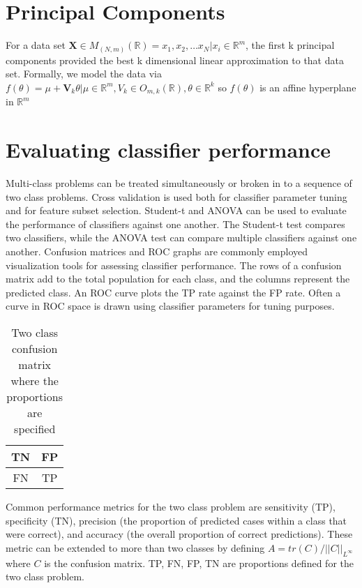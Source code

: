\section{Principal Components} For a data set $\textbf{X} \in
M_{(N,m)}(\mathbb{R}) = { x_1, x_2, \ldots x_N | x_i \in
\mathbb{R}^m } $, the first k principal components provided the
best k dimensional linear approximation to that data set.
Formally, we model the data via $f(\theta) = \mu + \textbf{V}_k
\theta | \mu \in \mathbb{R}^m, V_k \in O_{m,k}(\mathbb{R}),
\theta \in \mathbb{R}^k$ so $f(\theta)$ is an affine hyperplane
in $\mathbb{R}^m$


\section{Evaluating classifier performance} Multi-class problems can be treated simultaneously or broken in to a sequence of two class problems.  Cross validation is used both for classifier parameter tuning and for feature subset selection.  Student-t and ANOVA can be used to evaluate the performance of classifiers against one another.  The Student-t test compares two classifiers, while the ANOVA test can compare multiple classifiers against one another.  Confusion matrices and ROC graphs are commonly employed visualization tools for assessing classifier performance. The rows of a confusion matrix add to the total population for each class, and the columns represent the predicted class.  An ROC curve plots the TP rate against the FP rate. Often a curve in ROC space is drawn using classifier parameters for tuning purposes.

\begin{table}[h]
\begin{tabular}{|c|c|}
  \hline
  TN &  FP \\
  \hline
  FN & TP \\
  \hline
\end{tabular}
\caption{Two class confusion matrix where the proportions are
specified}
\end{table}

Common performance metrics for the two class problem are sensitivity (TP), specificity (TN), precision (the proportion of predicted cases within a class that were correct), and accuracy (the overall proportion of correct predictions). These metric can be extended to more than two classes by defining $A=tr ( C ) / || C ||_{L^\infty}$ where $C$ is the confusion matrix. TP, FN, FP, TN are proportions defined for the two class problem.


